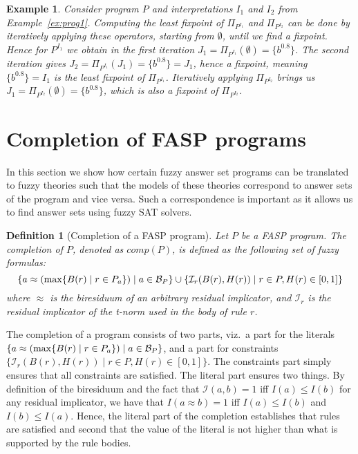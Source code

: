 \documentclass{tlp}
\newcommand{\hbase}[1]{{\ensuremath{{\cal B}_{#1}}}}
\newcommand{\body}[1]{\ensuremath{B(#1)}}
\newcommand{\head}[1]{\ensuremath{H(#1)}}
\newcommand{\comp}[1]{\ensuremath{comp(#1)}}
\newcommand{\feq}{\ensuremath{\approx}}
\newcommand{\prefimp}{\mathcal{I}}
\newcommand{\nfimcons}[1]{\Pi_{#1}}
\newtheorem{definition}{Definition}
\newtheorem{example}{Example}
\begin{document}
\begin{example}
Consider program $P$ and interpretations $I_1$ and $I_2$ from Example~\ref{ex:prog1}. Computing the least fixpoint of $\nfimcons{P^{I_1}}$ and $\nfimcons{P^{I_2}}$ can be done by iteratively applying these operators, starting from $\emptyset$, until we find a fixpoint. Hence for $P^{I_{1}}$ we obtain in the first iteration $J_{1} = \nfimcons{P^{I_{1}}}(\emptyset) = \{ b^{0.8} \}$. The second iteration gives $J_{2} = \nfimcons{P^{I_{1}}}(J_{1}) = \{ b^{0.8} \} = J_{1}$, hence a fixpoint, meaning $\{ b^{0.8} \} = I_{1}$ is the least fixpoint of $\nfimcons{P^{I_{1}}}$.
Iteratively applying $\nfimcons{P^{I_{2}}}$ brings us $J_{1} = \nfimcons{P^{I_{2}}}(\emptyset) = \{ b^{0.8} \}$, which is also a fixpoint of $\nfimcons{P^{I_{2}}}$.
\end{example}

\section{Completion of FASP programs}\label{sec:completion}

In this section we show how certain fuzzy answer set programs can be translated to fuzzy theories such that the models of these theories correspond to answer sets of the program and vice versa. Such a correspondence is important as it allows us to find answer sets using fuzzy SAT solvers.

\begin{definition}[Completion of a FASP program]\label{def:kcompletion}
 Let $P$ be a FASP program. The completion of $P$, denoted as $\comp{P}$, is defined as the following set of fuzzy formulas:
$$\{ a \feq (\max \{ \body{r} \mid r \in P_a \}) \mid a \in \hbase{P} \} \cup \{ \prefimp_r(\body{r},\head{r}) \mid r \in P, \head{r} \in [0,1] \}$$
where $\feq$ is the biresiduum of an arbitrary residual implicator, and $\prefimp_r$ is the residual implicator of the t-norm used in the body of rule $r$.
\end{definition}

The completion of a program consists of two parts, viz.~a part for the literals $\{ a \feq (\max \{ \body{r} \mid r \in P_a \}) \mid a \in \hbase{P} \}$, and a part for constraints $\{ \prefimp_r(\body{r},\head{r}) \mid r \in P, \head{r} \in [0,1] \}$. The constraints part simply ensures that all constraints are satisfied. The literal part ensures two things. By definition of the biresiduum and the fact that $\prefimp(a,b) = 1$ iff $I(a) \leq I(b)$ for any residual implicator, we have that $I(a \feq b) = 1$ iff $I(a) \leq I(b)$ and $I(b) \leq I(a)$. Hence, the literal part of the completion establishes that rules are satisfied and second that the value of the literal is not higher than what is supported by the rule bodies.
\end{document}
